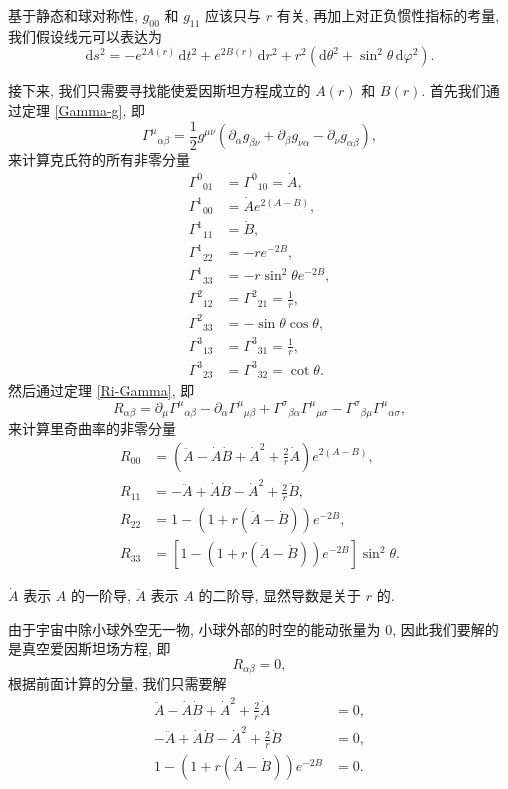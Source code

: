 基于静态和球对称性, $g_{00}$ 和 $g_{11}$ 应该只与 $r$ 有关, 再加上对正负惯性指标的考量, 我们假设线元可以表达为
\[ \mathrm{d}s^2=-e^{2A(r)}\,\mathrm{d}t^2+e^{2B(r)}\,\mathrm{d}r^2+r^2(\mathrm{d}\theta^2+\sin^2\theta\,\mathrm{d}\varphi^2). \] 

接下来, 我们只需要寻找能使爱因斯坦方程成立的 $A(r)$ 和 $B(r)$. 首先我们通过定理 \ref{Gamma-g}, 即
\[ \Gamma^{\mu}{}_{\alpha\beta}=\frac{1}{2}g^{\mu\nu}(\partial_{\alpha}g_{\beta\nu}+\partial_{\beta}g_{\nu\alpha}-\partial_{\nu}g_{\alpha\beta}), \] 
来计算克氏符的所有非零分量
\begin{align*}
	\Gamma^{0}{}_{01}&=\Gamma^{0}{}_{10}=\dot{A},\\
	\Gamma^{1}{}_{00}&=\dot{A}e^{2(A-B)},\\
	\Gamma^{1}{}_{11}&=\dot{B},\\
	\Gamma^{1}{}_{22}&=-re^{-2B},\\
	\Gamma^{1}{}_{33}&=-r\sin^2\theta e^{-2B},\\
	\Gamma^{2}{}_{12}&=\Gamma^{2}{}_{21}=\frac{1}{r},\\
	\Gamma^{2}{}_{33}&=-\sin\theta\cos\theta,\\
	\Gamma^{3}{}_{13}&=\Gamma^{3}{}_{31}=\frac{1}{r},\\
	\Gamma^{3}{}_{23}&=\Gamma^{3}{}_{32}=\cot\theta.
\end{align*}
然后通过定理 \ref{Ri-Gamma}, 即
\[ R_{\alpha\beta}=\partial_\mu\Gamma^{\mu}{}_{\alpha\beta}-\partial_\alpha\Gamma^{\mu}{}_{\mu\beta}+\Gamma^{\sigma}{}_{\beta\alpha}\Gamma^{\mu}{}_{\mu\sigma}-\Gamma^{\sigma}{}_{\beta\mu}\Gamma^{\mu}{}_{\alpha\sigma}, \] 
来计算里奇曲率的非零分量
\begin{align*}
	R_{00} &= \left(\ddot{A}-\dot{A}\dot{B}+\dot{A}^2+\frac{2}{r}\dot{A}\right) e^{2(A-B)},\\
	R_{11} &= -\ddot{A}+\dot{A}\dot{B}-\dot{A}^2+\frac{2}{r}\dot{B},\\
	R_{22} &= 1-(1+r(\dot{A}-\dot{B}))e^{-2B},\\
	R_{33} &= \left[ 1-\left( 1+r(\dot{A}-\dot{B}) \right)e^{-2B} \right]\sin^{2}\theta.
\end{align*}
\begin{remark}
	$\dot{A}$ 表示 $A$ 的一阶导, $\ddot{A}$ 表示 $A$ 的二阶导, 显然导数是关于 $r$ 的.
\end{remark}
由于宇宙中除小球外空无一物, 小球外部的时空的能动张量为 $0$, 因此我们要解的是真空爱因斯坦场方程, 即
\[ R_{\alpha\beta}=0, \] 
根据前面计算的分量, 我们只需要解
\begin{align*}
	\ddot{A}-\dot{A}\dot{B}+\dot{A}^2+\frac{2}{r}\dot{A} &= 0,\\
	-\ddot{A}+\dot{A}\dot{B}-\dot{A}^2+\frac{2}{r}\dot{B} &= 0,\\
	1-(1+r(\dot{A}-\dot{B}))e^{-2B} &= 0.
\end{align*}
